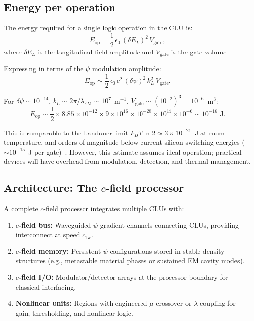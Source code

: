 \documentclass[aps,prd,twocolumn,superscriptaddress,nofootinbib,floatfix]{revtex4-2}
\newcommand{\psifield}{\psi}
\newcommand{\cfield}{c_{\text{1w}}}
\newcommand{\cvac}{c}
\newcommand{\ee}[1]{\times 10^{#1}}
\begin{document}
\subsection{Energy per operation}

The energy required for a single logic operation in the CLU is:
\begin{equation}
E_{\text{op}} = \frac{1}{2}\,\epsilon_0\,(\delta E_L)^2\,
V_{\text{gate}},
\label{eq:energy_per_op}
\end{equation}
where $\delta E_L$ is the longitudinal field amplitude and
$V_{\text{gate}}$ is the gate volume.

Expressing in terms of the $\psifield$ modulation amplitude:
\begin{equation}
E_{\text{op}} \sim \frac{1}{2}\,\epsilon_0\,\cvac^2\,
(\delta\psifield)^2\,k_L^2\,V_{\text{gate}}.
\label{eq:energy_psi}
\end{equation}

For $\delta\psifield \sim 10^{-14}$,
$k_L \sim 2\pi/\lambda_{\text{EM}} \sim 10^7$~m$^{-1}$,
$V_{\text{gate}} \sim (10^{-2})^3 = 10^{-6}$~m$^3$:
\begin{equation}
E_{\text{op}} \sim \frac{1}{2}\times 8.85\ee{-12}\times 9\ee{16}
\times 10^{-28}\times 10^{14}\times 10^{-6}
\sim 10^{-16}\text{ J}.
\label{eq:energy_numerical}
\end{equation}

This is comparable to the Landauer limit $k_B T\ln 2 \approx
3\ee{-21}$~J at room temperature, and orders of magnitude below
current silicon switching energies ($\sim 10^{-15}$~J per
gate)~\cite{IRDS2024}. However, this estimate assumes ideal
operation; practical devices will have overhead from modulation,
detection, and thermal management.

\subsection{Architecture: The $c$-field processor}

A complete $c$-field processor integrates multiple CLUs with:

\begin{enumerate}
\item \textbf{$c$-field bus:} Waveguided $\psifield$-gradient
channels connecting CLUs, providing interconnect at speed $\cfield$.

\item \textbf{$c$-field memory:} Persistent $\psifield$
configurations stored in stable density structures (e.g.,
metastable material phases or sustained EM cavity modes).

\item \textbf{$c$-field I/O:} Modulator/detector arrays at the
processor boundary for classical interfacing.

\item \textbf{Nonlinear units:} Regions with engineered
$\mu$-crossover or $\lambda$-coupling for gain, thresholding,
and nonlinear logic.
\end{enumerate}
\end{document}
